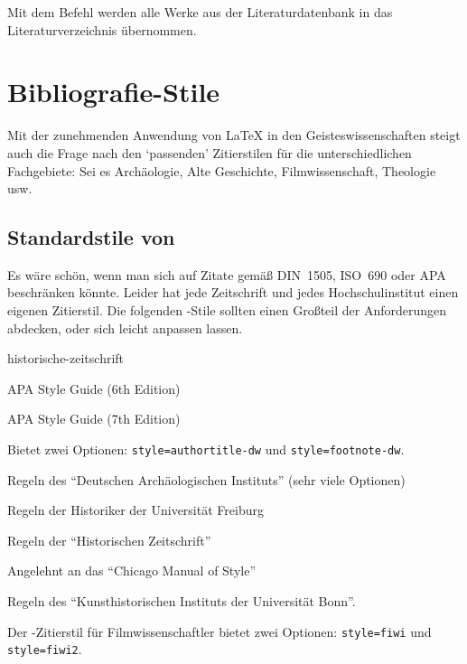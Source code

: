 Mit dem Befehl \marg{*} werden alle Werke aus der
Literaturdatenbank in das Literaturverzeichnis übernommen.


\section{Bibliografie-Stile}\label{sec:bibliografiestile}
Mit der zunehmenden Anwendung von \LaTeX{} in den Geisteswissenschaften steigt auch die Frage nach den \enquote*{passenden} Zitierstilen für die unterschiedlichen Fachgebiete:
Sei es Archäologie, Alte Geschichte, Filmwissenschaft, Theologie usw.
\subsection{Standardstile von \biblatex}

Es wäre schön, wenn man sich auf Zitate gemäß DIN~1505, ISO~690 oder APA beschränken könnte.
Leider hat jede Zeitschrift und jedes Hochschulinstitut einen eigenen Zitierstil.
Die folgenden \biblatex-Stile sollten einen Großteil der Anforderungen abdecken, oder sich leicht anpassen lassen.

\begin{labeling}{historische-zeitschrift}
  \item[biblatex-apa6]      APA Style Guide (6th Edition)
  \item[biblatex-apa]       APA Style Guide (7th Edition)
  \item[biblatex-dw]        Bietet zwei Optionen: \lstinline/style=authortitle-dw/ und \lstinline/style=footnote-dw/.
  \item[biblatex-archaeology] Regeln des \enquote{Deutschen Archäologischen Instituts} (sehr viele Optionen)
  \item[geschichtsfrkl]     Regeln der Historiker der Universität Freiburg
  \item[historische-zeitschrift] Regeln der \enquote{Historischen
    Zeitschrift}
  \item[biblatex-historian] Angelehnt an das \enquote{Chicago Manual of Style}
  \item[biblatex-arthistory-bonn] Regeln des \enquote{Kunsthistorischen Instituts der Universität Bonn}.
  \item[biblatex-fiwi]      Der \biblatex-Zitierstil für Filmwissenschaftler bietet zwei Optionen: \lstinline/style=fiwi/ und \lstinline/style=fiwi2/.
\end{labeling}


